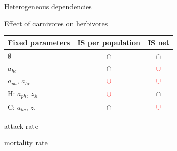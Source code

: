 \documentclass[11pt, compress, aspectratio=1610]{beamer}
\providecommand{\tightlist}{%
  \setlength{\itemsep}{0pt}\setlength{\parskip}{0pt}}
\newcommand{\stopcols}{\end{columns}}
\begin{document}

\begin{frame}{Heterogeneous dependencies}

\centering
Effect of carnivores on herbivores ~

\begin{longtable}[c]{@{}lcc@{}}
\toprule
Fixed parameters & IS per population & IS net\tabularnewline
\midrule
\endhead
\(\emptyset\) & \(\cap\) & \(\cap\)\tabularnewline
\(a_{hc}\) & \(\cap\) & \(\textcolor{red}{\cup}\)\tabularnewline
\(a_{ph}\), \(a_{hc}\) & \(\textcolor{red}{\cup}\) &
\(\textcolor{red}{\cup}\)\tabularnewline
H: \(a_{ph}\), \(z_h\) & \(\textcolor{red}{\cup}\) &
\(\cap\)\tabularnewline
C: \(a_{hc}\), \(z_c\) & \(\cap\) &
\(\textcolor{red}{\cup}\)\tabularnewline
\bottomrule
\end{longtable}

\begin{description}
\tightlist
\item[\(a\)]
attack rate
\item[\(z\)]
mortality rate
\end{description}

\end{frame}
\end{document}
